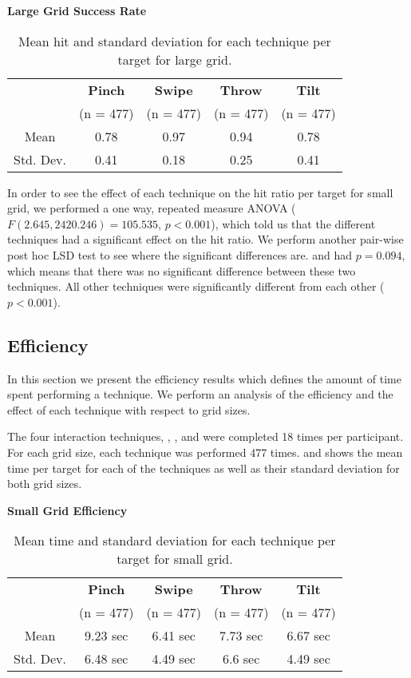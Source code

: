\begin{table}[H]
	\centering
	\textbf{Large Grid Success Rate}\\[4pt]
	\begin{tabular}{|c|c|c|c|c|}
			\hline
			\rowcolor[HTML]{9B9B9B} 
			& \textbf{Pinch} & \textbf{Swipe} & \textbf{Throw} & \textbf{Tilt} \\
			\rowcolor[HTML]{9B9B9B} 
			 & (n = 477) & (n = 477) & (n = 477) & (n = 477) \\ \hline
			Mean & 0.78         & 0.97          & 0.94          & 0.78         \\ \hline
			Std. Dev. & 0.41 & 0.18 & 0.25 & 0.41 \\ \hline
	\end{tabular}
	\caption{Mean hit  and standard deviation for each technique per target for large grid.}
	\label{tab:meanHitTechniqueLarge}
\end{table}

In order to see the effect of each technique on the hit ratio per target for small grid, we performed a one way, repeated measure ANOVA ($F(2.645,2420.246)=105.535$, $p<0.001$), which told us that the different techniques had a significant effect on the hit ratio. 
We perform another pair-wise post hoc LSD test to see where the significant differences are. \pinch and \tilt had $p=0.094$, which means that there was no significant difference between these two techniques. All other techniques were significantly different from each other ($p<0.001$). 

\subsection{Efficiency}
In this section we present the efficiency results which defines the amount of time spent performing a technique.
We perform an analysis of the efficiency and the effect of each technique with respect to grid sizes.

The four interaction techniques, \pinch, \swipe, \throw and \tilt were completed 18 times per participant. 
For each grid size, each technique was performed 477 times. 
 and  shows the mean time per target for each of the techniques as well as their standard deviation for both grid sizes. 
\begin{table}[H]
	\centering
	\textbf{Small Grid Efficiency}\\[4pt]
	\begin{tabular}{|c|c|c|c|c|}
		\hline
		\rowcolor[HTML]{9B9B9B} 
		 & \textbf{Pinch} & \textbf{Swipe} & \textbf{Throw} & \textbf{Tilt} \\ 
		 \rowcolor[HTML]{9B9B9B} 
		 & (n = 477) & (n = 477) & (n = 477) & (n = 477) \\ \hline
		Mean & 9.23  sec         & 6.41 sec          & 7.73 sec          & 6.67 sec         \\ \hline
		Std. Dev. & 6.48 sec & 4.49 sec & 6.6 sec & 4.49 sec \\ \hline
	\end{tabular}
	\caption{Mean time and standard deviation for each technique per target for small grid.}
	\label{tab:meanTimesTechniqueSmall}
\end{table}

